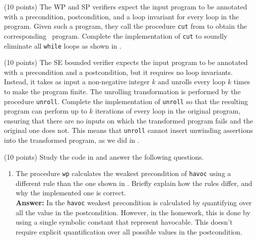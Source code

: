 \documentclass{handout}
\begin{document}
\begin{questions}

\item (10 points) \label{prob:ivl-inv} The WP and SP verifiers expect the input
program to be annotated with a precondition, postcondition, and a loop invariant
for every loop in the program. Given such a program, they call the procedure
\lstinline{cut} from  to obtain the corresponding \ivl\
program. Complete the implementation of \lstinline{cut} to soundly eliminate all
\lstinline{while} loops as shown in \lecture{12}.



\item (10 points) \label{prob:ivl-unroll} The SE bounded verifier expects the
input program to be annotated with a precondition and a postcondition, but it
requires no loop invariants.  Instead, it takes as input a non-negative integer
$k$ and unrolls every loop $k$ times to make the program finite. The unrolling
transformation is performed by the procedure \lstinline{unroll}. Complete the
implementation of \lstinline{unroll}  so that the resulting \ivl program can
perform up to $k$ iterations of every loop in the original \imp program,
ensuring that  there are no inputs on which the transformed program fails and
the original one does not. This means that \lstinline{unroll} cannot insert
unwinding assertions into the transformed program, as we did in \lecture{5}.



\item (10 points) \label{prob:ver-study} Study the code in 
and answer the following questions.

\begin{enumerate}
\item The procedure \lstinline{wp} calculates the weakest precondition of
 \lstinline{havoc} using a different rule than the one shown in .
 Briefly explain how the rules differ, and why the implemented one is
 correct.\looseness=-1
 \\
 
 \textbf{Answer:} In  the \lstinline{havoc} weakest precondition is calculated by quantifying over all the value in the postcondition. However, in the homework, this is done by using a single symbolic constant that represent havocable. This doesn't require explicit quantification over all possible values in the postcondition.



\end{enumerate}
\end{questions}
\end{document}
